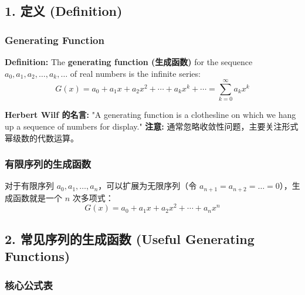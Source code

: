 \documentclass[10pt,a4paper,openany]{ctexbook}
\theoremstyle{definition}
\theoremstyle{remark}
\begin{document}
\subsection{1. 定义 (Definition)}

\subsubsection{Generating Function}

\textbf{Definition:} The \textbf{generating function (生成函数)} for the sequence $a_0, a_1, a_2, \dots, a_k, \dots$ of real numbers is the infinite series:
\[
G(x) = a_0 + a_1 x + a_2 x^2 + \cdots + a_k x^k + \cdots = \sum_{k=0}^{\infty} a_k x^k
\]

\textbf{Herbert Wilf 的名言:} "A generating function is a clothesline on which we hang up a sequence of numbers for display."
\textbf{注意:} 通常忽略收敛性问题，主要关注形式幂级数的代数运算。
\subsubsection{有限序列的生成函数}

对于有限序列 $a_0, a_1, \dots, a_n$，可以扩展为无限序列（令 $a_{n+1} = a_{n+2} = \dots = 0$），生成函数就是一个 $n$ 次多项式：
\[
G(x) = a_0 + a_1 x + a_2 x^2 + \cdots + a_n x^n
\]

\vspace{-2pt}

\subsection{2. 常见序列的生成函数 (Useful Generating Functions)}

\subsubsection{核心公式表}
\end{document}
